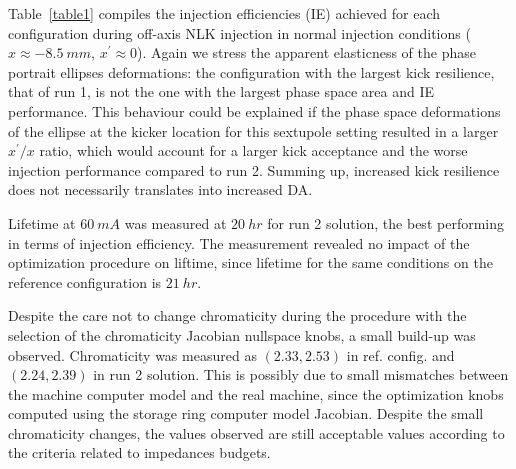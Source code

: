 Table~\ref{table1} compiles the injection efficiencies (IE) achieved for each configuration during off-axis NLK injection in normal injection conditions ($x\approx -8.5~\unit{mm}$, $x^\prime\approx 0 $).
Again we stress the apparent elasticness of the phase portrait ellipses deformations: the configuration with the largest kick resilience, that of run 1, is not the one with the largest phase space area and IE performance. This behaviour could be explained if the phase space deformations of the ellipse at the kicker location for this sextupole setting resulted in a larger $x^\prime/x$ ratio, which would account for a larger kick acceptance and the worse injection performance compared to run 2. Summing up, increased kick resilience does not necessarily translates into increased DA.

Lifetime at $60~\unit{mA}$ was measured at $20~\unit{hr}$ for run 2 solution, the best performing in terms of injection efficiency. The measurement revealed no impact of the optimization procedure on liftime, since lifetime for the same conditions on the reference configuration is $21~\unit{hr}$.

Despite the care not to change chromaticity during the procedure with the selection of the chromaticity Jacobian nullspace knobs, a small build-up was observed. Chromaticity was measured as $(2.33, 2.53)$ in ref. config. and $(2.24, 2.39)$ in run 2 solution. This is possibly due to small mismatches between the machine computer model and the real machine, since the optimization knobs computed using the storage ring computer model Jacobian. Despite the small chromaticity changes, the values observed are still acceptable values according to the criteria related to impedances budgets.

